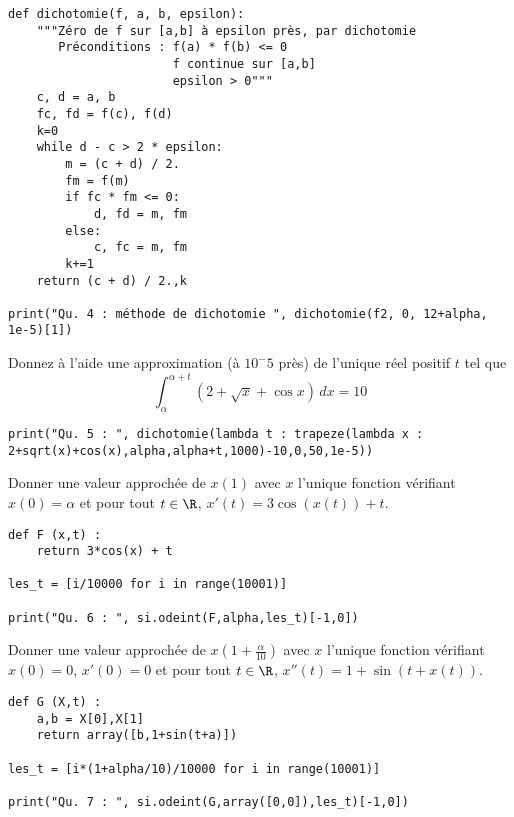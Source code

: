 \begin{lstlisting}
def dichotomie(f, a, b, epsilon):
    """Zéro de f sur [a,b] à epsilon près, par dichotomie
       Préconditions : f(a) * f(b) <= 0
                       f continue sur [a,b]
                       epsilon > 0"""
    c, d = a, b
    fc, fd = f(c), f(d)
    k=0
    while d - c > 2 * epsilon:
        m = (c + d) / 2.
        fm = f(m)
        if fc * fm <= 0:
            d, fd = m, fm
        else:
            c, fc = m, fm
        k+=1
    return (c + d) / 2.,k
    
print("Qu. 4 : méthode de dichotomie ", dichotomie(f2, 0, 12+alpha, 1e-5)[1])

\end{lstlisting} 
  


\question{}
  Donnez à l'aide une approximation (à $10^-5$ près) de l'unique réel positif $t$ tel que
  \begin{equation*}
    \int_{\alpha}^{\alpha+t} (2+\sqrt{x}+\cos x)\, dx = 10
  \end{equation*}

  
\begin{lstlisting}
print("Qu. 5 : ", dichotomie(lambda t : trapeze(lambda x : 2+sqrt(x)+cos(x),alpha,alpha+t,1000)-10,0,50,1e-5))
\end{lstlisting}
  

\question{}
  Donner une valeur approchée de $x(1)$ avec $x$ l'unique fonction
  vérifiant $x(0)=\alpha$ et pour tout $t\in \R$, $x'(t) = 3\cos(x(t))
  + t$.

\begin{lstlisting}
def F (x,t) :
    return 3*cos(x) + t

les_t = [i/10000 for i in range(10001)]

print("Qu. 6 : ", si.odeint(F,alpha,les_t)[-1,0])
\end{lstlisting}
  

\question{}
  Donner une valeur approchée de $x(1+\frac{\alpha}{10})$ avec $x$ l'unique fonction
  vérifiant $x(0)=0$, $x'(0)=0$ et pour tout $t\in \R$, $x''(t) = 1 + \sin(t+x(t))$.

\begin{lstlisting}
def G (X,t) :
    a,b = X[0],X[1]
    return array([b,1+sin(t+a)])

les_t = [i*(1+alpha/10)/10000 for i in range(10001)]

print("Qu. 7 : ", si.odeint(G,array([0,0]),les_t)[-1,0])

\end{lstlisting}
  
